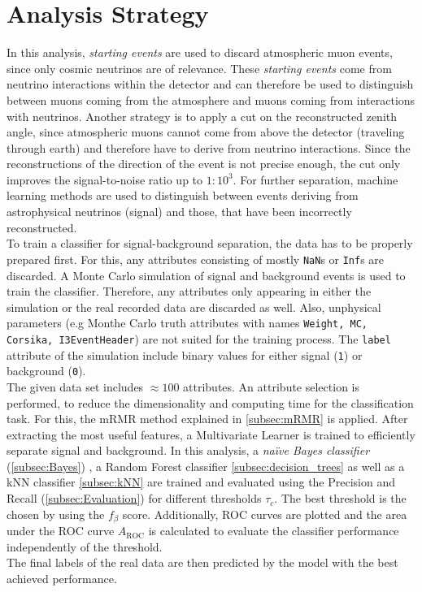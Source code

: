 \section{Analysis Strategy}
\label{sec:Strategy}
In this analysis, \textit{starting events} are used to discard atmospheric muon events, since only cosmic neutrinos are of relevance. These \textit{starting events} come from neutrino
interactions within the detector and can therefore be used to distinguish between muons coming from the atmosphere and muons coming from interactions with neutrinos. Another strategy is 
to apply a cut on the reconstructed zenith angle, since atmospheric muons cannot come from above the detector (traveling through earth) and therefore have to derive from neutrino interactions.
Since the reconstructions of the direction of the event is not precise enough, the cut only improves the signal-to-noise ratio up to $1:10^3$. For further separation, machine learning
methods are used to distinguish between events deriving from astrophysical neutrinos (signal) and those, that have been incorrectly reconstructed.\\
To train a classifier for signal-background separation, the data has to be properly prepared first. For this, any attributes consisting of mostly \texttt{NaN}s or \texttt{Inf}s are discarded.
A Monte Carlo simulation of signal and background events is used to train the classifier. Therefore, any attributes only appearing in either the simulation or the real recorded data are
discarded as well. Also, unphysical parameters (e.g Monthe Carlo truth attributes with names \texttt{Weight, MC, Corsika, I3EventHeader}) are not suited for the training process. The \texttt{label}
attribute of the simulation include binary values for either signal (\texttt{1}) or background (\texttt{0}).\\
The given data set includes $\approx 100$ attributes. An attribute selection is performed, to reduce the dimensionality and computing time for the classification task. For this, the mRMR method explained
in \autoref{subsec:mRMR} is applied. After extracting the most useful features, a Multivariate Learner is trained to efficiently separate signal and background. In this analysis, a \textit{na\"ive Bayes classifier} (\autoref{subsec:Bayes})
, a Random Forest classifier \autoref{subsec:decision_trees} as well as a kNN classifier \autoref{subsec:kNN} are trained and evaluated using the Precision and Recall (\autoref{subsec:Evaluation}) for different thresholds $\tau_c$. The best threshold is the chosen by 
using the $f_{\beta}$ score. Additionally, ROC curves are plotted and the area under the ROC curve $A_{\mathrm{ROC}}$ is calculated to evaluate the classifier performance independently of the threshold.\\
The final labels of the real data are then predicted by the model with the best achieved performance.
